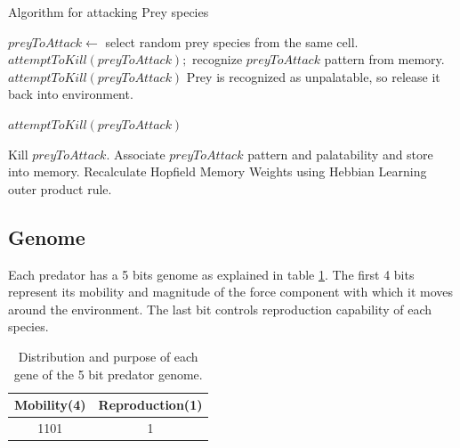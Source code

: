 \begin{algorithm}
	\caption{Algorithm for attacking Prey species}
	\label{algo:algorithm-attack-prey}
	\begin{algorithmic}
				\STATE $preyToAttack \gets$ select random prey species from the same cell.
					\STATE $attemptToKill(preyToAttack);$ 
				\ELSE
					\STATE recognize $preyToAttack$ pattern from memory.
						\STATE $attemptToKill(preyToAttack)$
					\ELSE 
						\STATE Prey is recognized as unpalatable, so release it back into environment.
					\ENDIF
				\ENDIF
			\ENDIF
		\ENDFOR
	\end{algorithmic}
\end{algorithm}

\begin{algorithm}
	\caption{$attemptToKill(preyToAttack)$}
	\label{algo:algorithm-attemptToKill}
	\begin{algorithmic}
		\STATE Kill $preyToAttack$.
		\IF {Memory size $< MaxMemorySize$}
			\STATE Associate $preyToAttack$ pattern and palatability and store into memory.
			\STATE Recalculate Hopfield Memory Weights using Hebbian Learning outer product rule.
		\ENDIF
	\end{algorithmic}	
\end{algorithm}

\subsection{Genome}
Each predator has a 5 bits genome as explained in table \ref{tab:predator-genome}. The first 4 bits represent its mobility and magnitude of the force component with which it moves around the environment. The last bit controls reproduction capability of each species.

\begin{table}[H]
\centering
\begin{tabular}{|c|c|}
	\hline
		\textbf{Mobility(4)} & \textbf{Reproduction(1)} \\ \hline
				 1101					   &					1						 		\\ \hline
\end{tabular}
\caption{Distribution and purpose of each gene of the 5 bit predator genome.}
\label{tab:predator-genome}
\end{table}

